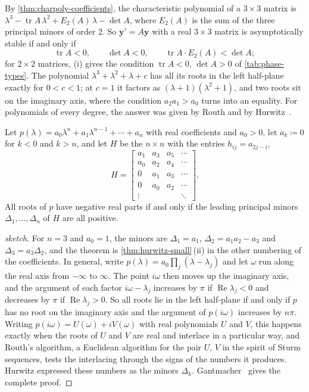 By \cref{thm:charpoly-coefficients}, the characteristic polynomial of a $3\times3$ matrix is $\lambda^3-\operatorname{tr}A\,\lambda^2+E_2(A)\,\lambda-\det A$, where $E_2(A)$ is the sum of the three principal minors of order $2$. So $\mathbf y'=A\mathbf y$ with a real $3\times3$ matrix is asymptotically stable if and only if
\[
\operatorname{tr}A<0,\qquad\det A<0,\qquad\operatorname{tr}A\cdot E_2(A)<\det A ;
\]
for $2\times2$ matrices, (i) gives the condition $\operatorname{tr}A<0$, $\det A>0$ of \cref{tab:phase-types}. The polynomial $\lambda^3+\lambda^2+\lambda+c$ has all its roots in the left half-plane exactly for $0<c<1$; at $c=1$ it factors as $(\lambda+1)(\lambda^2+1)$, and two roots sit on the imaginary axis, where the condition $a_2a_1>a_0$ turns into an equality. For polynomials of every degree, the answer was given by Routh and by Hurwitz~\cite{routh1877,hurwitz1895}.

\begin{theorem}
\label{thm:routh-hurwitz}
Let $p(\lambda)=a_0\lambda^n+a_1\lambda^{n-1}+\cdots+a_n$ with real coefficients and $a_0>0$, let $a_k\coloneqq0$ for $k<0$ and $k>n$, and let $H$ be the $n\times n$  with the entries $h_{ij}=a_{2j-i}$,
\[
H=\begin{bmatrix}a_1&a_3&a_5&\cdots\\a_0&a_2&a_4&\cdots\\0&a_1&a_3&\cdots\\0&a_0&a_2&\cdots\\\vdots&&&\ddots\end{bmatrix}.
\]
All roots of $p$ have negative real parts if and only if the leading principal minors $\Delta_1,\ldots,\Delta_n$ of $H$ are all positive.
\end{theorem}

\begin{proof}[sketch]
For $n=3$ and $a_0=1$, the minors are $\Delta_1=a_1$, $\Delta_2=a_1a_2-a_3$ and $\Delta_3=a_3\Delta_2$, and the theorem is \cref{thm:hurwitz-small}\,(ii) in the other numbering of the coefficients. In general, write $p(\lambda)=a_0\prod_j(\lambda-\lambda_j)$ and let $\omega$ run along the real axis from $-\infty$ to $\infty$. The point $i\omega$ then moves up the imaginary axis, and the argument of each factor $i\omega-\lambda_j$ increases by $\pi$ if $\operatorname{Re}\lambda_j<0$ and decreases by $\pi$ if $\operatorname{Re}\lambda_j>0$. So all roots lie in the left half-plane if and only if $p$ has no root on the imaginary axis and the argument of $p(i\omega)$ increases by $n\pi$. Writing $p(i\omega)=U(\omega)+iV(\omega)$ with real polynomials $U$ and $V$, this happens exactly when the roots of $U$ and $V$ are real and interlace in a particular way, and Routh's algorithm, a Euclidean algorithm for the pair $U$, $V$ in the spirit of Sturm sequences, tests the interlacing through the signs of the numbers it produces. Hurwitz expressed these numbers as the minors $\Delta_k$. Gantmacher~\cite[Chap.~XV]{gantmacher1959vol2} gives the complete proof.
\end{proof}

